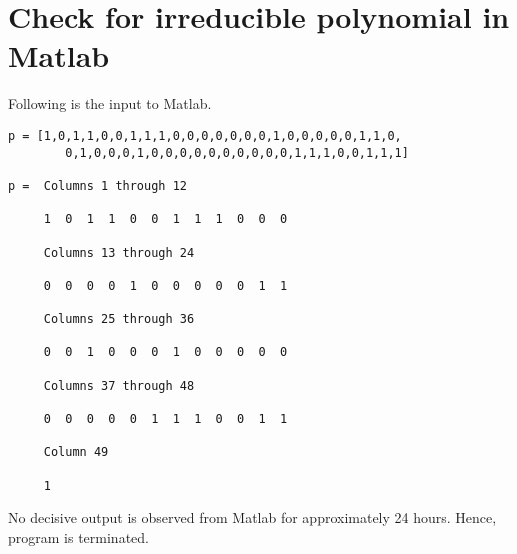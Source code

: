 \chapter{Check for irreducible polynomial in Matlab}
\label{app:irreducible-polynomial}
Following is the input to Matlab.
 
\begin{lstlisting}[frame=tb]
p = [1,0,1,1,0,0,1,1,1,0,0,0,0,0,0,0,1,0,0,0,0,0,1,1,0,
		0,1,0,0,0,1,0,0,0,0,0,0,0,0,0,0,1,1,1,0,0,1,1,1]

p =  Columns 1 through 12

     1  0  1  1  0  0  1  1  1  0  0  0

  	 Columns 13 through 24

     0  0  0  0  1  0  0  0  0  0  1  1

     Columns 25 through 36

     0  0  1  0  0  0  1  0  0  0  0  0

     Columns 37 through 48

     0  0  0  0  0  1  1  1  0  0  1  1

     Column 49

     1
\end{lstlisting}

No decisive output is observed from Matlab for approximately 24 hours. Hence, program is terminated.
